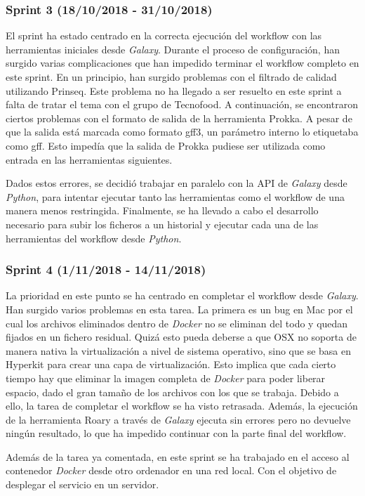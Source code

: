 \subsubsection{Sprint 3 (18/10/2018 - 31/10/2018)}
El sprint ha estado centrado en la correcta ejecución del workflow con las herramientas iniciales desde \textit{Galaxy}. Durante el proceso de configuración, han surgido varias complicaciones que han impedido terminar el workflow completo en este sprint. 
En un principio, han surgido problemas con el filtrado de calidad utilizando Prinseq. Este problema no ha llegado a ser resuelto en este sprint a falta de tratar el tema con el grupo de Tecnofood.
A continuación, se encontraron ciertos problemas con el formato de salida de la herramienta Prokka. A pesar de que la salida está marcada como formato gff3, un parámetro interno lo etiquetaba como gff. Esto impedía que la salida de Prokka pudiese ser utilizada como entrada en las herramientas siguientes.

Dados estos errores, se decidió trabajar en paralelo con la API de \textit{Galaxy} desde \textit{Python}, para intentar ejecutar tanto las herramientas como el workflow de una manera menos restringida. Finalmente, se ha llevado a cabo el desarrollo necesario para subir los ficheros a un historial y ejecutar cada una de las herramientas del workflow desde \textit{Python}.

\subsubsection{Sprint 4 (1/11/2018 - 14/11/2018)}
La prioridad en este punto se ha centrado en completar el workflow desde \textit{Galaxy}. Han surgido varios problemas en esta tarea. La primera es un bug en Mac por el cual los archivos eliminados dentro de \textit{Docker} no se eliminan del todo y quedan fijados en un fichero residual. Quizá esto pueda deberse a que OSX no soporta de manera nativa la virtualización a nivel de sistema operativo, sino que se basa en Hyperkit para crear una capa de virtualización. Esto implica que cada cierto tiempo hay que eliminar la imagen completa de \textit{Docker} para poder liberar espacio, dado el gran tamaño de los archivos con los que se trabaja. Debido a ello, la tarea de completar el workflow se ha visto retrasada. Además, la ejecución de la herramienta Roary a través de \textit{Galaxy} ejecuta sin errores pero no devuelve ningún resultado, lo que ha impedido continuar con la parte final del workflow. 

Además de la tarea ya comentada, en este sprint se ha trabajado en el acceso al contenedor \textit{Docker} desde otro ordenador en una red local. Con el objetivo de desplegar el servicio en un servidor.

